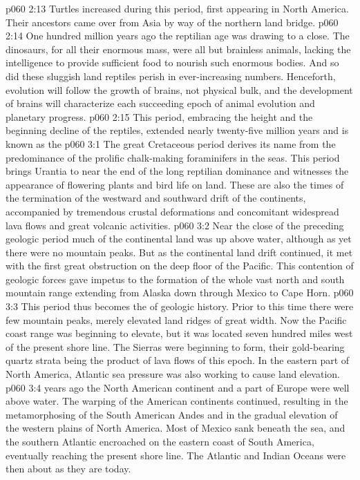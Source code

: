 \vs p060 2:13 Turtles increased during this period, first appearing in North America. Their ancestors came over from Asia by way of the northern land bridge.
\pc \vs p060 2:14 One hundred million years ago the reptilian age was drawing to a close. The dinosaurs, for all their enormous mass, were all but brainless animals, lacking the intelligence to provide sufficient food to nourish such enormous bodies. And so did these sluggish land reptiles perish in ever\hyp{}increasing numbers. Henceforth, evolution will follow the growth of brains, not physical bulk, and the development of brains will characterize each succeeding epoch of animal evolution and planetary progress.
\pc \vs p060 2:15 This period, embracing the height and the beginning decline of the reptiles, extended nearly twenty\hyp{}five million years and is known as the 
\vs p060 3:1 The great Cretaceous period derives its name from the predominance of the prolific chalk\hyp{}making foraminifers in the seas. This period brings Urantia to near the end of the long reptilian dominance and witnesses the appearance of flowering plants and bird life on land. These are also the times of the termination of the westward and southward drift of the continents, accompanied by tremendous crustal deformations and concomitant widespread lava flows and great volcanic activities.
\vs p060 3:2 Near the close of the preceding geologic period much of the continental land was up above water, although as yet there were no mountain peaks. But as the continental land drift continued, it met with the first great obstruction on the deep floor of the Pacific. This contention of geologic forces gave impetus to the formation of the whole vast north and south mountain range extending from Alaska down through Mexico to Cape Horn.
\vs p060 3:3 This period thus becomes the  of geologic history. Prior to this time there were few mountain peaks, merely elevated land ridges of great width. Now the Pacific coast range was beginning to elevate, but it was located seven hundred miles west of the present shore line. The Sierras were beginning to form, their gold\hyp{}bearing quartz strata being the product of lava flows of this epoch. In the eastern part of North America, Atlantic sea pressure was also working to cause land elevation.
\pc \vs p060 3:4  years ago the North American continent and a part of Europe were well above water. The warping of the American continents continued, resulting in the metamorphosing of the South American Andes and in the gradual elevation of the western plains of North America. Most of Mexico sank beneath the sea, and the southern Atlantic encroached on the eastern coast of South America, eventually reaching the present shore line. The Atlantic and Indian Oceans were then about as they are today.
